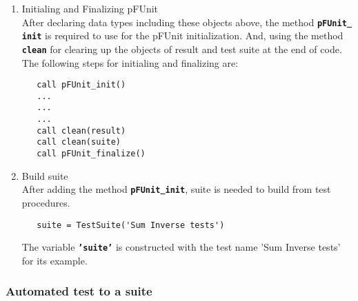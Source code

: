 \documentclass[10pt]{article}
\newcommand{\pfunit}{{\sc pFUnit }}
\begin{document}
\begin{enumerate}
\item Initialing and Finalizing \pfunit \\
After declaring data types including these objects above, the method \textbf{\texttt{pFUnit\underline{ }init}} is required to use for the pFUnit initialization.  And, using the method \textbf{\texttt{clean}} for clearing up the objects of result and test suite at the end of code.    The following steps for initialing and finalizing are:
\begin{verbatim}
   call pFUnit_init()
   ...
   ...
   ...
   call clean(result)
   call clean(suite)
   call pFUnit_finalize()
\end{verbatim}

\item Build suite \\
After adding the method  \textbf{\texttt{pFUnit\underline{ }init}}, suite is needed to build from test procedures.

\begin{verbatim}
   suite = TestSuite('Sum Inverse tests')
\end{verbatim}

The variable \textbf{\texttt{'suite'}} is constructed with the test name 'Sum Inverse tests' for its example.

\end{enumerate}


\subsubsection{Automated test to a suite}
\end{document}
